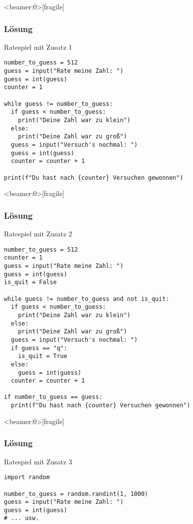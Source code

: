 \begin{frame}<beamer:0>[fragile]
\frametitle{Lösung}
\begin{solutionblock}{Ratespiel mit Zusatz 1}
\begin{verbatim}
number_to_guess = 512
guess = input("Rate meine Zahl: ")
guess = int(guess)
counter = 1

while guess != number_to_guess:
  if guess < number_to_guess:
    print("Deine Zahl war zu klein")
  else:
    print("Deine Zahl war zu groß")
  guess = input("Versuch's nochmal: ")
  guess = int(guess)
  counter = counter + 1
  
print(f"Du hast nach {counter} Versuchen gewonnen")	
\end{verbatim}
\end{solutionblock}
\end{frame}


\begin{frame}<beamer:0>[fragile]
\frametitle{Lösung}
\begin{solutionblock}{Ratespiel mit Zusatz 2}
\begin{verbatim}
number_to_guess = 512
counter = 1
guess = input("Rate meine Zahl: ")
guess = int(guess)
is_quit = False

while guess != number_to_guess and not is_quit:
  if guess < number_to_guess:
    print("Deine Zahl war zu klein")
  else:
    print("Deine Zahl war zu groß")
  guess = input("Versuch's nochmal: ")
  if guess == "q":
    is_quit = True
  else: 
    guess = int(guess)
  counter = counter + 1

if number_to_guess == guess: 
  print(f"Du hast nach {counter} Versuchen gewonnen")	
\end{verbatim}
\end{solutionblock}
\end{frame}




\begin{frame}<beamer:0>[fragile]
\frametitle{Lösung}
\begin{solutionblock}{Ratespiel mit Zusatz 3}
\begin{verbatim}
import random 

number_to_guess = random.randint(1, 1000)
guess = input("Rate meine Zahl: ")
guess = int(guess)
# ... usw. 
\end{verbatim}
\end{solutionblock}
\end{frame}







	




